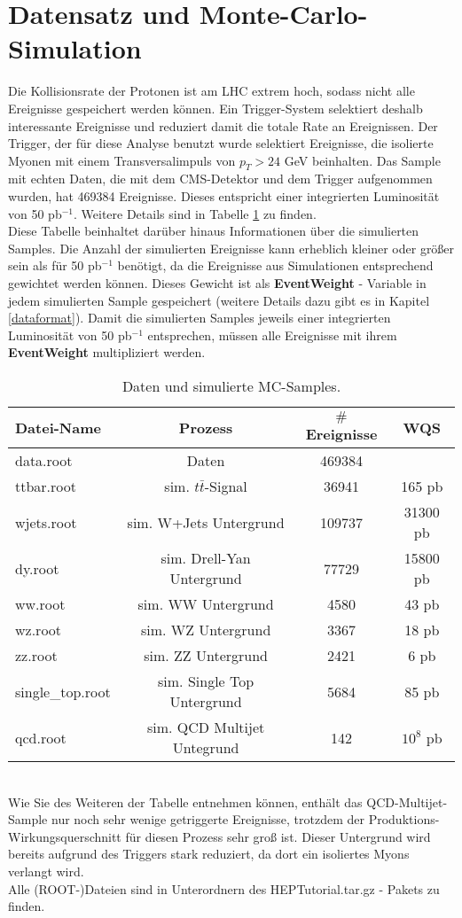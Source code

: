 \section{Datensatz und Monte-Carlo-Simulation}
\label{datasets}
Die Kollisionsrate der Protonen ist am LHC extrem hoch, sodass nicht alle Ereignisse gespeichert werden k\"onnen. Ein Trigger-System selektiert deshalb interessante Ereignisse und reduziert damit die totale Rate an Ereignissen. Der Trigger, der f\"ur diese Analyse benutzt wurde selektiert Ereignisse, die isolierte Myonen mit einem Transversalimpuls von $p_{T}>24$ GeV beinhalten. Das Sample mit echten Daten, die mit dem CMS-Detektor und dem Trigger aufgenommen wurden, hat 469384 Ereignisse. Dieses entspricht einer integrierten Luminosit\"at von 50 pb$^{-1}$. Weitere Details sind in Tabelle \ref{table_samples} zu finden.\\
Diese Tabelle beinhaltet dar\"uber hinaus Informationen \"uber die simulierten Samples. Die Anzahl der simulierten Ereignisse kann erheblich kleiner oder gr\"o\ss{}er sein als f\"ur 50 pb$^{-1}$ ben\"otigt, da die Ereignisse aus Simulationen entsprechend gewichtet werden k\"onnen. Dieses Gewicht ist als \textbf{EventWeight} - Variable in jedem simulierten Sample gespeichert (weitere Details dazu gibt es in Kapitel \ref{dataformat}). Damit die simulierten Samples jeweils einer integrierten Luminosit\"at von 50 pb$^{-1}$ entsprechen, m\"ussen alle Ereignisse mit ihrem \textbf{EventWeight} multipliziert werden.
\begin{small}
\begin{table}[h!]
  \centering
  \begin{tabular}{|l|c|c|c|}
    \hline 
Datei-Name & Prozess & $\#$Ereignisse & WQS \\ \hline\hline
data.root & Daten & 469384 & \\ \hline
ttbar.root & sim. $t\bar{t}$-Signal & 36941 & 165 pb  \\
wjets.root & sim. W+Jets Untergrund & 109737 & 31300 pb \\
dy.root & sim. Drell-Yan Untergrund & 77729 & 15800 pb \\
ww.root & sim. WW Untergrund & 4580 & 43 pb \\
wz.root & sim. WZ Untergrund & 3367 & 18 pb \\
zz.root & sim. ZZ Untergrund & 2421 & 6 pb \\
single\_top.root & sim. Single Top Untergrund & 5684 & 85 pb \\
qcd.root & sim. QCD Multijet Untegrund & 142 & $10^8$ pb \\
    \hline
  \end{tabular}
  \caption{Daten und simulierte MC-Samples.}
  \label{table_samples}
\end{table}
\end{small}
\\Wie Sie des Weiteren der Tabelle entnehmen k\"onnen, enth\"alt das QCD-Multijet-Sample nur noch sehr wenige getriggerte Ereignisse, trotzdem der Produktions-Wirkungsquerschnitt f\"ur diesen Prozess sehr gro\ss{} ist. Dieser Untergrund wird bereits aufgrund des Triggers stark reduziert, da dort ein isoliertes Myons verlangt wird.\\
Alle (ROOT-)Dateien sind in Unterordnern des HEPTutorial.tar.gz - Pakets zu finden.